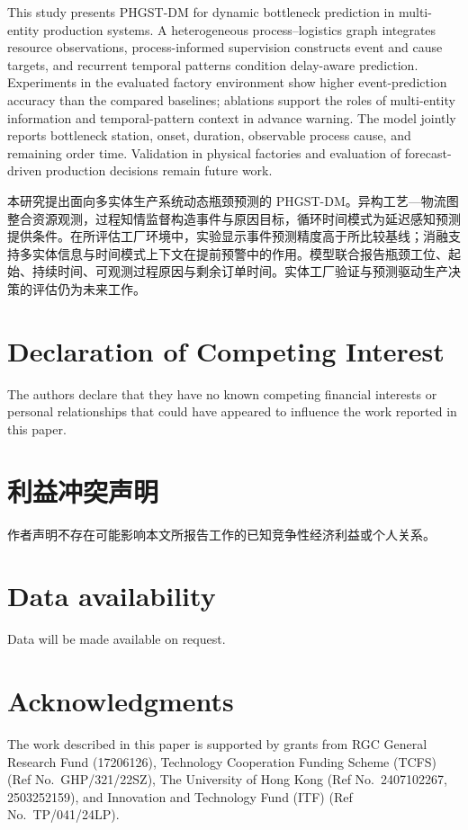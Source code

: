 \documentclass[a4paper,fleqn]{cas-dc}
\newcommand{\zhpara}[1]{%
  \par\begingroup\small\color{black!72}\noindent #1\par\endgroup}
\begin{document}
This study presents PHGST-DM for dynamic bottleneck prediction in multi-entity production systems. A heterogeneous process--logistics graph integrates resource observations, process-informed supervision constructs event and cause targets, and recurrent temporal patterns condition delay-aware prediction. Experiments in the evaluated factory environment show higher event-prediction accuracy than the compared baselines; ablations support the roles of multi-entity information and temporal-pattern context in advance warning. The model jointly reports bottleneck station, onset, duration, observable process cause, and remaining order time. Validation in physical factories and evaluation of forecast-driven production decisions remain future work.

\zhpara{本研究提出面向多实体生产系统动态瓶颈预测的 PHGST-DM。异构工艺—物流图整合资源观测，过程知情监督构造事件与原因目标，循环时间模式为延迟感知预测提供条件。在所评估工厂环境中，实验显示事件预测精度高于所比较基线；消融支持多实体信息与时间模式上下文在提前预警中的作用。模型联合报告瓶颈工位、起始、持续时间、可观测过程原因与剩余订单时间。实体工厂验证与预测驱动生产决策的评估仍为未来工作。}


\printcredits

\section*{Declaration of Competing Interest}
The authors declare that they have no known competing financial interests or personal relationships that could have appeared to influence the work reported in this paper.

\zhpara{\section*{利益冲突声明}
作者声明不存在可能影响本文所报告工作的已知竞争性经济利益或个人关系。}


\section*{Data availability}
Data will be made available on request.

\section*{Acknowledgments}
The work described in this paper is supported by grants from RGC General Research Fund (17206126), Technology Cooperation Funding Scheme (TCFS) (Ref No.\ GHP/321/22SZ), The University of Hong Kong (Ref No.\ 2407102267, 2503252159), and Innovation and Technology Fund (ITF) (Ref No.\ TP/041/24LP).
\end{document}
